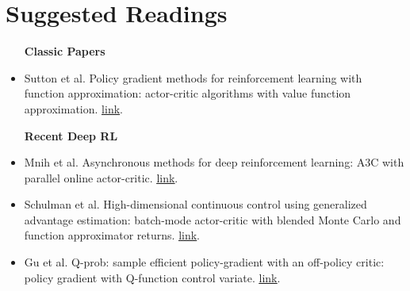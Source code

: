 \documentclass{tufte-handout}
\begin{document}
\section{Suggested Readings}

\begin{itemize}
   \item [\textbf{Classic Papers}]
   \item Sutton et al. Policy gradient methods for reinforcement learning with function approximation: actor-critic algorithms with value function approximation.
   \href{https://papers.nips.cc/paper/1713-policy-gradient-methods-for-reinforcement-learning-with-function-approximation.pdf}{\underline{link}}.

   \item [\textbf{Recent Deep RL}]
   \item Mnih et al. Asynchronous methods for deep reinforcement learning: A3C with parallel online actor-critic.
   \href{https://arxiv.org/abs/1602.01783}{\underline{link}}.
   \item Schulman et al. High-dimensional continuous control using generalized advantage estimation: batch-mode actor-critic with blended Monte Carlo
   and function approximator returns.
   \href{https://arxiv.org/pdf/1506.02438.pdf}{\underline{link}}.
   \item Gu et al. Q-prob: sample efficient policy-gradient with an off-policy critic: policy gradient with Q-function control variate.
   \href{https://arxiv.org/abs/1611.02247}{\underline{link}}.


\end{itemize}
\end{document}
